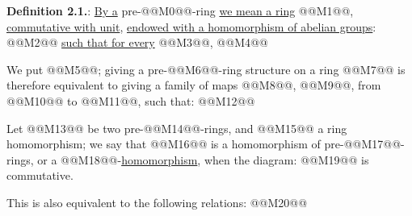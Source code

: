 \textbf{Definition 2.1.}: \uline{By a} pre-@@M0@@-ring \uline{we mean a ring} @@M1@@, \uline{commutative with unit}, \uline{endowed with a homomorphism of abelian groups}:
@@M2@@
\uline{such that for every} @@M3@@, @@M4@@

We put @@M5@@; giving a pre-@@M6@@-ring structure on a ring @@M7@@ is therefore equivalent to giving a family of maps @@M8@@, @@M9@@, from @@M10@@ to @@M11@@, such that:
@@M12@@

Let @@M13@@ be two pre-@@M14@@-rings, and @@M15@@ a ring homomorphism; we say that @@M16@@ is a homomorphism of pre-@@M17@@-rings, or a @@M18@@-\uline{homomorphism}, when the diagram:
@@M19@@
is commutative.

This is also equivalent to the following relations:
@@M20@@


